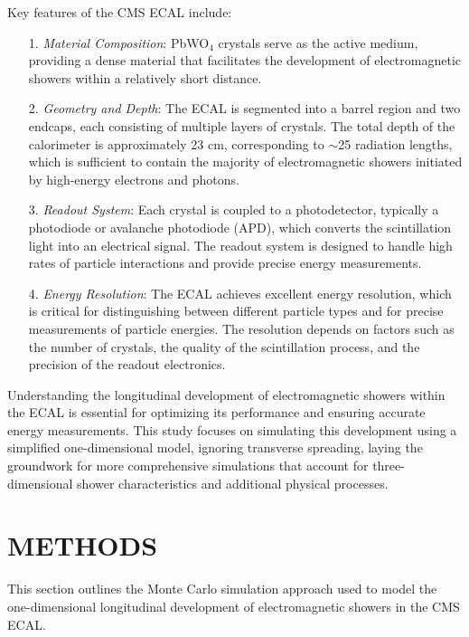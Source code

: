 \documentclass[twocolumn]{aastex631}
\begin{document}
Key features of the CMS ECAL include: \citep{CMS2024arXiv2403.15518} 

\begin{itemize}
    \item[1.] \textit{Material Composition}: PbWO$_\text{4}$ crystals serve as the active
        medium, providing a dense material that facilitates the development of
        electromagnetic showers within a relatively short distance.
    \item[2.] \textit{Geometry and Depth}: The ECAL is segmented into a barrel
        region and two endcaps, each consisting of multiple layers of
        crystals. The total depth of the calorimeter is approximately 23 cm,
        corresponding to $\sim$25 radiation lengths, which is sufficient to
        contain the majority of electromagnetic showers initiated by
        high-energy electrons and photons.
    \item[3.] \textit{Readout System}: Each crystal is coupled to a
        photodetector, typically a photodiode or avalanche photodiode (APD),
        which converts the scintillation light into an electrical signal. The
        readout system is designed to handle high rates of particle interactions
        and provide precise energy measurements.
    \item[4.] \textit{Energy Resolution}: The ECAL achieves excellent energy
        resolution, which is critical for distinguishing between different
        particle types and for precise measurements of particle energies. The
        resolution depends on factors such as the number of crystals, the
        quality of the scintillation process, and the precision of the readout
        electronics. 
\end{itemize}

Understanding the longitudinal development of electromagnetic showers within
the ECAL is essential for optimizing its performance and ensuring accurate
energy measurements. This study focuses on simulating this development using a
simplified one-dimensional model, ignoring transverse spreading, laying the
groundwork for more comprehensive
simulations that account for three-dimensional shower characteristics and
additional physical processes.




\section{METHODS} \label{sec_3} 

This section outlines the Monte Carlo simulation approach used to model the
one-dimensional longitudinal development of electromagnetic showers in the CMS
ECAL. 
\end{document}
